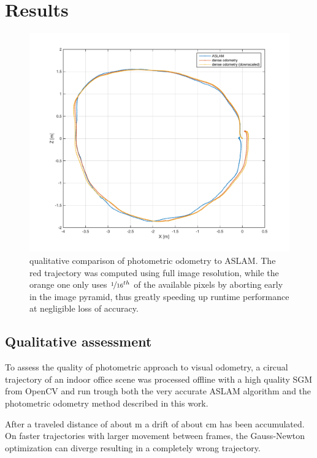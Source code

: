 \chapter{Results}
\label{sec:results}



\begin{figure}
    \centering
    \includegraphics[width=\textwidth]{images/traj_aslam_downscaled.pdf}
    \caption{qualitative comparison of photometric odometry to ASLAM. The red
    trajectory was computed using full image resolution, while the orange one
    only uses $\nicefrac{1}{16}^{th}$ of the available pixels by aborting early in
the image pyramid, thus greatly speeding up runtime performance at negligible
loss of accuracy.}
    \label{fig:trajectory}
\end{figure}

\section{Qualitative assessment}
\label{sec:results_qualitative}

To assess the quality of photometric approach to visual odometry, a circual
trajectory of an indoor office scene was processed offline with a high quality
SGM from OpenCV and run trough both the very accurate ASLAM algorithm
\cite{leutenegger2013keyframe} and the photometric odometry method described in
this work.

After a traveled distance of about \unit[12]{m} a drift of about \unit[20]{cm}
has been accumulated. On faster trajectories with larger movement between
frames, the Gauss-Newton optimization can diverge resulting in a completely
wrong trajectory.

